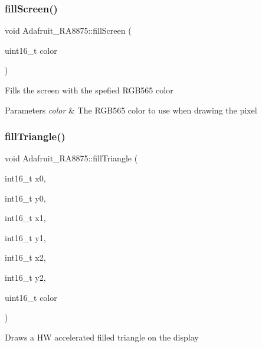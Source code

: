 \subsubsection{\texorpdfstring{fillScreen()}{fillScreen()}}
{\footnotesize\ttfamily void Adafruit\+\_\+\+R\+A8875\+::fill\+Screen (\begin{DoxyParamCaption}\item[{uint16\+\_\+t}]{color }\end{DoxyParamCaption})}

Fills the screen with the spefied R\+G\+B565 color


\begin{DoxyParams}{Parameters}
{\em color} & The R\+G\+B565 color to use when drawing the pixel \\
\hline
\end{DoxyParams}
\mbox{\label{class_adafruit___r_a8875_aaa22db3f01ad6fd1d0e4c26a35ece7d9}} 
\subsubsection{\texorpdfstring{fillTriangle()}{fillTriangle()}}
{\footnotesize\ttfamily void Adafruit\+\_\+\+R\+A8875\+::fill\+Triangle (\begin{DoxyParamCaption}\item[{int16\+\_\+t}]{x0,  }\item[{int16\+\_\+t}]{y0,  }\item[{int16\+\_\+t}]{x1,  }\item[{int16\+\_\+t}]{y1,  }\item[{int16\+\_\+t}]{x2,  }\item[{int16\+\_\+t}]{y2,  }\item[{uint16\+\_\+t}]{color }\end{DoxyParamCaption})}

Draws a HW accelerated filled triangle on the display


